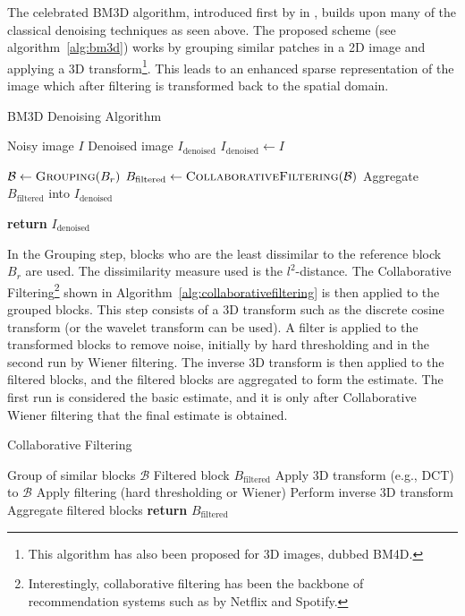 The celebrated \gls{BM3D} algorithm, introduced first by \citeauthor{dabovImageDenoisingSparse2007} in \cite{dabovImageDenoisingSparse2007}, builds upon many of the classical denoising techniques as seen above. The proposed scheme (see algorithm~\ref{alg:bm3d}) works by grouping similar patches in a 2D image and applying a 3D transform\footnote{This algorithm has also been proposed for 3D images, dubbed BM4D.}. This leads to an enhanced sparse representation of the image which after filtering is transformed back to the spatial domain.
\begin{algorithm}
    \caption{BM3D Denoising Algorithm}\label{alg:bm3d}
    \begin{algorithmic}[1]
    \Require Noisy image $I$
    \Ensure Denoised image $I_{\text{denoised}}$
    \Statex
        \State $I_{\text{denoised}} \gets I$
        
            \State $\mathcal{B} \gets \textsc{Grouping}(B_r)$
            \State $B_{\text{filtered}} \gets \textsc{CollaborativeFiltering}(\mathcal{B})$
            \State Aggregate $B_{\text{filtered}}$ into $I_{\text{denoised}}$
        \EndFor
        
        \State \textbf{return} $I_{\text{denoised}}$
    \EndProcedure
    \end{algorithmic}
\end{algorithm}

In the Grouping step, blocks who are the least dissimilar to the reference block $B_r$ are used. The dissimilarity measure used is the $l^2$-distance. The Collaborative Filtering\footnote{Interestingly, collaborative filtering has been the backbone of recommendation systems such as by Netflix and Spotify.} shown in Algorithm~\ref{alg:collaborativefiltering} is then applied to the grouped blocks. This step consists of a 3D transform such as the discrete cosine transform (or the wavelet transform can be used). A filter is applied to the transformed blocks to remove noise, initially by hard thresholding and in the second run by Wiener filtering. The inverse 3D transform is then applied to the filtered blocks, and the filtered blocks are aggregated to form the estimate. The first run is considered the basic estimate, and it is only after Collaborative Wiener filtering that the final estimate is obtained.
    
\begin{algorithm}
    \caption{Collaborative Filtering}\label{alg:collaborativefiltering}
    \begin{algorithmic}[1]
    \Require Group of similar blocks $\mathcal{B}$
    \Ensure Filtered block $B_{\text{filtered}}$
        \State Apply 3D transform (e.g., DCT) to $\mathcal{B}$
        \State Apply filtering (hard thresholding or Wiener)
        \State Perform inverse 3D transform
        \State Aggregate filtered blocks
        \State \textbf{return} $B_{\text{filtered}}$
    \EndProcedure
    \end{algorithmic}
\end{algorithm}

